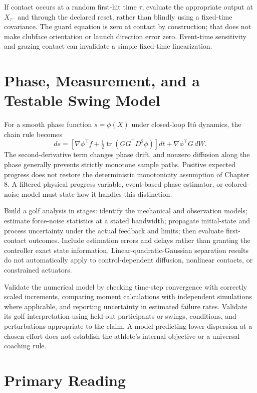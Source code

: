 \documentclass[12pt, openany]{book}
\theoremstyle{plain}
\begin{document}
If contact occurs at a random first-hit time $\tau$, evaluate the appropriate output at $X_{\tau^-}$ and through the declared reset, rather than blindly using a fixed-time covariance. The guard equation is zero at contact by construction; that does not make clubface orientation or launch direction error zero. Event-time sensitivity and grazing contact can invalidate a simple fixed-time linearization.

\section{Phase, Measurement, and a Testable Swing Model}

For a smooth phase function $s=\phi(X)$ under closed-loop Itô dynamics, the chain rule becomes
\begin{equation}
ds=\left[\nabla\phi^\top f+
\tfrac12\operatorname{tr}(GG^\top D^2\phi)\right]dt
+\nabla\phi^\top G\,dW .
\end{equation}
The second-derivative term changes phase drift, and nonzero diffusion along the phase generally prevents strictly monotone sample paths. Positive expected progress does not restore the deterministic monotonicity assumption of Chapter 8. A filtered physical progress variable, event-based phase estimator, or colored-noise model must state how it handles this distinction.

Build a golf analysis in stages: identify the mechanical and observation models; estimate force-noise statistics at a stated bandwidth; propagate initial-state and process uncertainty under the actual feedback and limits; then evaluate first-contact outcomes. Include estimation errors and delays rather than granting the controller exact state information. Linear-quadratic-Gaussian separation results do not automatically apply to control-dependent diffusion, nonlinear contacts, or constrained actuators.

Validate the numerical model by checking time-step convergence with correctly scaled increments, comparing moment calculations with independent simulations where applicable, and reporting uncertainty in estimated failure rates. Validate its golf interpretation using held-out participants or swings, conditions, and perturbations appropriate to the claim. A model predicting lower dispersion at a chosen effort does not establish the athlete's internal objective or a universal coaching rule.

\section{Primary Reading}
\end{document}
